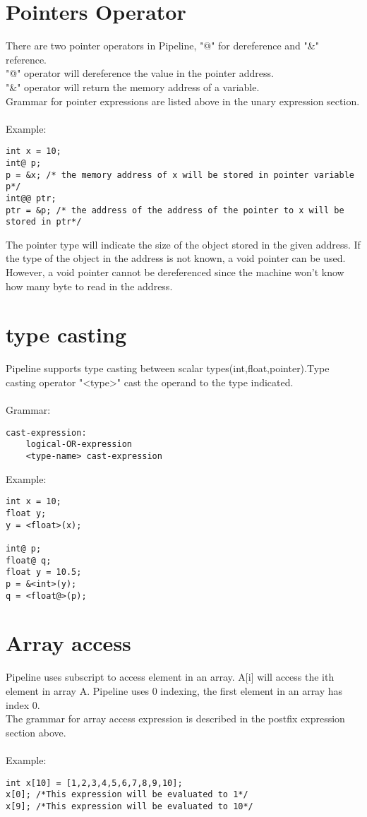 \documentclass[./LRM_main.tex]{subfiles}
\begin{document}
\section{Pointers Operator}
There are two pointer operators in Pipeline, "@" for dereference and "\&" reference.\\
"@" operator will dereference the value in the pointer address.\\
"\&" operator will return the memory address of a variable.\\
Grammar for pointer expressions are listed above in the unary expression section.\\
\vspace{1 mm}\\
Example:
\begin{lstlisting}
int x = 10;
int@ p;
p = &x; /* the memory address of x will be stored in pointer variable p*/
int@@ ptr;
ptr = &p; /* the address of the address of the pointer to x will be stored in ptr*/
\end{lstlisting}
The pointer type will indicate the size of the object stored in the given address. If the type of the object in the address is not known, a void pointer can be used. However, a void pointer cannot be dereferenced since the machine won't know how many byte to read in the address. 
\section{type casting}
Pipeline supports type casting between scalar types(int,float,pointer).Type casting operator "<type>" cast the operand to the type indicated.\\
\vspace{1 mm}\\
Grammar:
\begin{lstlisting}
cast-expression:
    logical-OR-expression
    <type-name> cast-expression
\end{lstlisting}
Example:
\begin{lstlisting}
int x = 10;
float y;
y = <float>(x);

int@ p;
float@ q;
float y = 10.5;
p = &<int>(y);
q = <float@>(p);
\end{lstlisting}
\section{Array access}
Pipeline uses subscript to access element in an array. A[i] will access the ith element in array A. Pipeline uses 0 indexing, the first element in an array has index 0.\\
The grammar for array access expression is described in the postfix expression section above.\\
\pagebreak\\
Example:
\begin{lstlisting}
int x[10] = [1,2,3,4,5,6,7,8,9,10];
x[0]; /*This expression will be evaluated to 1*/
x[9]; /*This expression will be evaluated to 10*/
\end{lstlisting}
\end{document}
